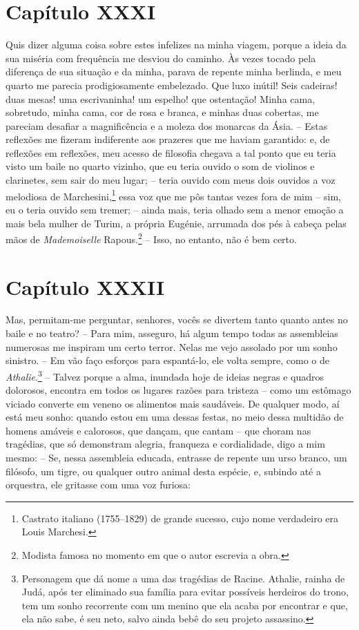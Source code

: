 \section*{Capítulo XXXI}

 Quis dizer alguma coisa sobre estes infelizes na minha viagem, porque a
ideia da sua miséria com frequência me desviou do caminho. Às vezes
tocado pela diferença de sua situação e da minha, parava de repente
minha berlinda, e meu quarto me parecia prodigiosamente embelezado. Que
luxo inútil! Seis cadeiras! duas mesas! uma escrivaninha! um espelho!
que ostentação! Minha cama, sobretudo, minha cama, cor de rosa e
branca, e minhas duas cobertas, me pareciam desafiar a magnificência e
a moleza dos monarcas da Ásia. -- Estas reflexões me fizeram
indiferente aos prazeres que me haviam garantido: e, de reflexões em
reflexões, meu acesso de filosofia chegava a tal ponto que eu teria
visto um baile no quarto vizinho, que eu teria ouvido o som de violinos
e clarinetes, sem sair do meu lugar; -- teria ouvido com meus dois
ouvidos a voz melodiosa de Marchesini,\footnote{ Castrato italiano
(1755--1829) de grande sucesso, cujo nome verdadeiro era Louis Marchesi.}
essa voz que me pôs tantas vezes fora de mim -- sim, eu o
teria ouvido sem tremer; -- ainda mais, teria olhado sem a menor
emoção a mais bela mulher de Turim, a própria Eugénie, arrumada dos pés
à cabeça pelas mãos de \textit{Mademoiselle} Rapous.\footnote{ Modista
famosa no momento em que o autor escrevia a obra.} -- Isso, no
entanto, não é bem certo. 

\section*{Capítulo XXXII}

 Mas, permitam-me perguntar, senhores, vocês se divertem tanto quanto
antes no baile e no teatro? -- Para mim, asseguro, há algum tempo
todas as assembleias numerosas me inspiram um certo terror. Nelas me
vejo assolado por um sonho sinistro. -- Em vão faço esforços para
espantá-lo, ele volta sempre, como o de \textit{Athalie}.\footnote{
Personagem que dá nome a uma das tragédias de Racine. Athalie, rainha
de Judá, após ter eliminado sua família para evitar possíveis herdeiros
do trono, tem um sonho recorrente com um menino que ela acaba por
encontrar e que, ela não sabe, é seu neto, salvo ainda bebê do seu
projeto assassino.} -- Talvez porque a alma, inundada hoje de
ideias negras e quadros dolorosos, encontra em todos os lugares razões
para tristeza -- como um estômago viciado converte em veneno os
alimentos mais saudáveis. De qualquer modo, aí está meu sonho: quando
estou em uma dessas festas, no meio dessa multidão de homens amáveis e
calorosos, que dançam, que cantam -- que choram nas tragédias, que só
demonstram alegria, franqueza e cordialidade, digo a mim mesmo: -- Se,
nessa assembleia educada, entrasse de repente um urso branco, um
filósofo, um tigre, ou qualquer outro animal desta espécie, e, subindo
até a orquestra, ele gritasse com uma voz furiosa:


